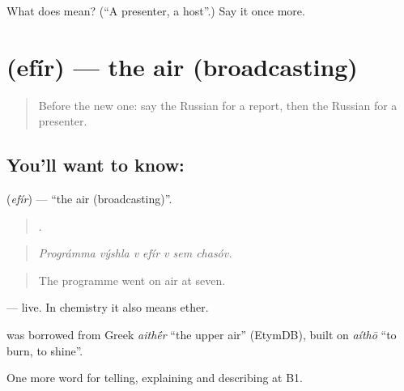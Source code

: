 \begin{tcolorbox}[breakable,colback=teal!4,colframe=teal!35!black,title={Before you move on}]
What does  mean? (\textquotedblleft{}A presenter, a host\textquotedblright{}.) Say it once more.
\end{tcolorbox}
\section[\texorpdfstring{\ru{эфир} (efír)}{эфир (efír)}]{ (efír) — the air (broadcasting)}

\label{lesson:RU-C281-efir}



\begin{quote}
Before the new one: say the Russian for a report, then the Russian for a presenter.
\end{quote}

\subsection*{You'll want to know: }
\textbf{} (\emph{efír}) — \textquotedblleft{}the air (broadcasting)\textquotedblright{}.

\begin{quote}
      .
\end{quote}

\begin{quote}
\emph{Prográmma výshla v efír v sem chasóv.}
\end{quote}

\begin{quote}
The programme went on air at seven.
\end{quote}

\emph{  } — live. In chemistry it also means ether.

\begin{cousinweb}
\emph{} was borrowed from Greek \emph{aith\'{\={e}}r} \textquotedblleft{}the upper air\textquotedblright{} (EtymDB), built on \emph{aíthō} \textquotedblleft{}to burn, to shine\textquotedblright{}.
\end{cousinweb}

\begin{grammarlens}[title={What you've built}]
One more word for telling, explaining and describing at B1.
\end{grammarlens}

